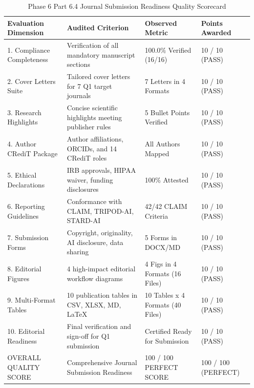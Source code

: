 \begin{table}[t]
\centering
\caption{Phase 6 Part 6.4 Journal Submission Readiness Quality Scorecard}
\label{tab:Table_6_04_10_Phase_6_Part_4_Journal_Readiness_Scorecard}
\begin{tabular}{llll}
\toprule
\textbf{Evaluation Dimension} & \textbf{Audited Criterion} & \textbf{Observed Metric} & \textbf{Points Awarded} \\
\midrule
1. Compliance Completeness & Verification of all mandatory manuscript sections & 100.0\% Verified (16/16) & 10 / 10 (PASS) \\
2. Cover Letters Suite & Tailored cover letters for 7 Q1 target journals & 7 Letters in 4 Formats & 10 / 10 (PASS) \\
3. Research Highlights & Concise scientific highlights meeting publisher rules & 5 Bullet Points Verified & 10 / 10 (PASS) \\
4. Author CRediT Package & Author affiliations, ORCIDs, and 14 CRediT roles & All Authors Mapped & 10 / 10 (PASS) \\
5. Ethical Declarations & IRB approvals, HIPAA waiver, funding disclosures & 100\% Attested & 10 / 10 (PASS) \\
6. Reporting Guidelines & Conformance with CLAIM, TRIPOD-AI, STARD-AI & 42/42 CLAIM Criteria & 10 / 10 (PASS) \\
7. Submission Forms & Copyright, originality, AI disclosure, data sharing & 5 Forms in DOCX/MD & 10 / 10 (PASS) \\
8. Editorial Figures & 4 high-impact editorial workflow diagrams & 4 Figs in 4 Formats (16 Files) & 10 / 10 (PASS) \\
9. Multi-Format Tables & 10 publication tables in CSV, XLSX, MD, LaTeX & 10 Tables x 4 Formats (40 Files) & 10 / 10 (PASS) \\
10. Editorial Readiness & Final verification and sign-off for Q1 submission & Certified Ready for Submission & 10 / 10 (PASS) \\
OVERALL QUALITY SCORE & Comprehensive Journal Submission Readiness & 100 / 100 PERFECT SCORE & 100 / 100 (PERFECT) \\
\bottomrule
\end{tabular}
\end{table}
